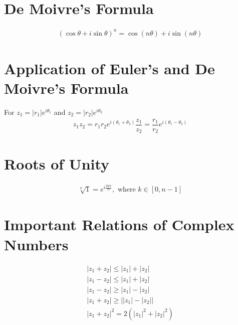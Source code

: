 \section{De Moivre's Formula}
\begin{align}
	(\cos\theta+i\sin\theta)^n=\cos (n\theta)+i\sin(n\theta)
\end{align}

\section{Application of Euler's and De Moivre's Formula}
For $z_1=\lvert r_1 \rvert e^{i\theta_1}$ and $z_2=\lvert r_2 \rvert e^{i\theta_2}$
\begin{align}
	z_1z_2=r_1r_2e^{i(\theta_1+\theta_2)}
	\dfrac{z_1}{z_2}=\dfrac{r_1}{r_2}e^{i(\theta_1-\theta_2)}
\end{align}

\section{Roots of Unity}
\begin{align}
	\sqrt[n]{1}=e^{i\frac{2k\pi}{n}},\text{ where } k \in [0,n-1]
\end{align}

\section{Important Relations of Complex Numbers}
\begin{align}
	\lvert z_1+z_2\rvert \leq \lvert z_1 \rvert+\lvert z_2\rvert\\
	\lvert z_1-z_2\rvert \leq \lvert z_1 \rvert+\lvert z_2\rvert\\
	\lvert z_1-z_2\rvert \geq \lvert z_1 \rvert-\lvert z_2\rvert\\
	\lvert z_1+z_2\rvert \geq \lvert \lvert z_1 \rvert-\lvert z_2\rvert\rvert\\
	\lvert z_1+z_2 \rvert^2=2(\lvert z_1 \rvert^2+\lvert z_2 \rvert^2)
\end{align}

